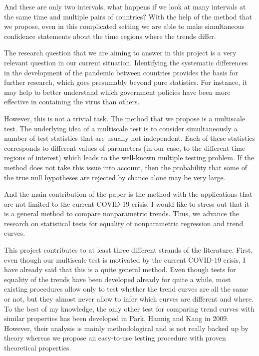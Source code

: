 \documentclass[a4paper,12pt]{article}
\begin{document}
And these are only two intervals, what happens if we look at many intervals at the same time and multiple pairs of countries? With the help of the method that we propose, even in this complicated setting we are able to make simultaneous confidence statements about the time regions where the trends differ.

The research question that we are aiming to answer in this project is a very relevant question in our current situation. Identifying the systematic differences in the development of the pandemic between countries provides the basis for further research, which goes presumably beyond pure statistics. For instance, it may help to better understand which government policies have been more effective in containing the virus than others. 

However, this is not a trivial task. The method that we propose is a multiscale test. The underlying idea of a multiscale test is to consider simultaneously a number of test statistics that are usually not independent. Each of these statistics corresponds to different values of parameters (in our case, to the different time regions of interest) which leads to the well-known multiple testing problem. If the method does not take this issue into account, then the probability that some of the true null hypotheses are rejected by chance alone may be very large.

And the main contribution of the paper is the method with the applications that are not limited to the current COVID-19 crisis. I would like to stress out that it is a general method to compare nonparametric trends. Thus, we advance the research on statistical tests for equality of nonparametric regression and trend curves.

This project contributes to at least three different strands of the literature. First, even though our multiscale test is motivated by the current COVID-19 crisis, I have already said that this is a quite general method. Even though tests for equality of the trends have been developed already for quite a while, most existing procedures allow only to test whether the trend curves are all the same or not, but they almost never allow to infer which curves are different and where. To the best of my knowledge, the only other test for comparing trend curves with similar properties has been developed in Park, Hannig and Kang in 2009. However, their analysis is mainly methodological and is not really backed up by theory whereas we propose an easy-to-use testing procedure with proven theoretical properties.
\end{document}
